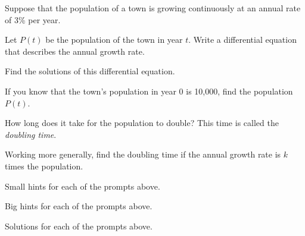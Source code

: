 \begin{activity} \label{A:7.4.1}  
Suppose that the population of a town is growing continuously at an annual rate of 3\% per year.

\ba
\item Let $P(t)$ be the population of the town in year $t$.  Write a
  differential equation that describes the annual growth rate.

\item Find the solutions of this differential equation.

\item If you know that the town's population in year 0 is 10,000, find
  the population $P(t)$.

\item How long does it take for the population to double?  This time
  is called the {\em doubling time}.

\item Working more generally, find the doubling time if the annual
  growth rate is $k$ times the population.

\ea
\end{activity}
\begin{smallhint}
\ba
	\item Small hints for each of the prompts above.
\ea
\end{smallhint}
\begin{bighint}
\ba
	\item Big hints for each of the prompts above.
\ea
\end{bighint}
\begin{activitySolution}
\ba
	\item Solutions for each of the prompts above.
\ea
\end{activitySolution}
\aftera